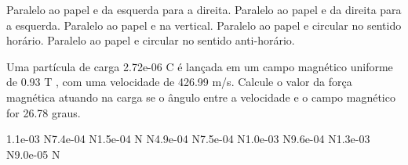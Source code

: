 \documentclass[12pt, addpoints]{exam}
\begin{document}
\begin{questions}
\begin{multicols*}{2}
\begin{choices}
\choice Paralelo ao papel e da esquerda para a direita. 
\choice Paralelo ao papel e da direita para a esquerda. 
\choice Paralelo ao papel e na vertical. 
\choice Paralelo ao papel e circular no sentido horário. 
\choice Paralelo ao papel e circular no sentido anti-horário. 
\end{choices}
\question Uma partícula de carga 2.72e-06 C é lançada em um campo magnético uniforme de    0.93 T , com uma velocidade de 426.99 m/s. Calcule o valor da força magnética atuando na carga se o ângulo entre a velocidade e o campo magnético for   26.78 graus.

\begin{oneparchoices}
\choice 1.1e-03 N\choice 7.4e-04 N\choice 1.5e-04 N N\choice 4.9e-04 N\choice 7.5e-04 N\choice 1.0e-03 N\choice 9.6e-04 N\choice 1.3e-03 N\choice 9.0e-05 N
\end{oneparchoices}\end{multicols*}
\end{questions}
\newpage
\end{document}
